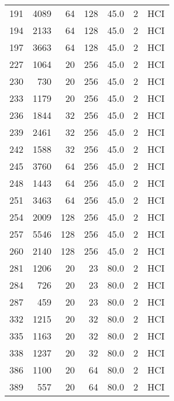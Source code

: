 \begin{longtable}{lrrrrrl}
191 &      4089 &         64 &       128 &           45.0 &       2 &  HCI \\
194 &      2133 &         64 &       128 &           45.0 &       2 &  HCI \\
197 &      3663 &         64 &       128 &           45.0 &       2 &  HCI \\
227 &      1064 &         20 &       256 &           45.0 &       2 &  HCI \\
230 &       730 &         20 &       256 &           45.0 &       2 &  HCI \\
233 &      1179 &         20 &       256 &           45.0 &       2 &  HCI \\
236 &      1844 &         32 &       256 &           45.0 &       2 &  HCI \\
239 &      2461 &         32 &       256 &           45.0 &       2 &  HCI \\
242 &      1588 &         32 &       256 &           45.0 &       2 &  HCI \\
245 &      3760 &         64 &       256 &           45.0 &       2 &  HCI \\
248 &      1443 &         64 &       256 &           45.0 &       2 &  HCI \\
251 &      3463 &         64 &       256 &           45.0 &       2 &  HCI \\
254 &      2009 &        128 &       256 &           45.0 &       2 &  HCI \\
257 &      5546 &        128 &       256 &           45.0 &       2 &  HCI \\
260 &      2140 &        128 &       256 &           45.0 &       2 &  HCI \\
281 &      1206 &         20 &        23 &           80.0 &       2 &  HCI \\
284 &       726 &         20 &        23 &           80.0 &       2 &  HCI \\
287 &       459 &         20 &        23 &           80.0 &       2 &  HCI \\
332 &      1215 &         20 &        32 &           80.0 &       2 &  HCI \\
335 &      1163 &         20 &        32 &           80.0 &       2 &  HCI \\
338 &      1237 &         20 &        32 &           80.0 &       2 &  HCI \\
386 &      1100 &         20 &        64 &           80.0 &       2 &  HCI \\
389 &       557 &         20 &        64 &           80.0 &       2 &  HCI \\

\end{longtable}
